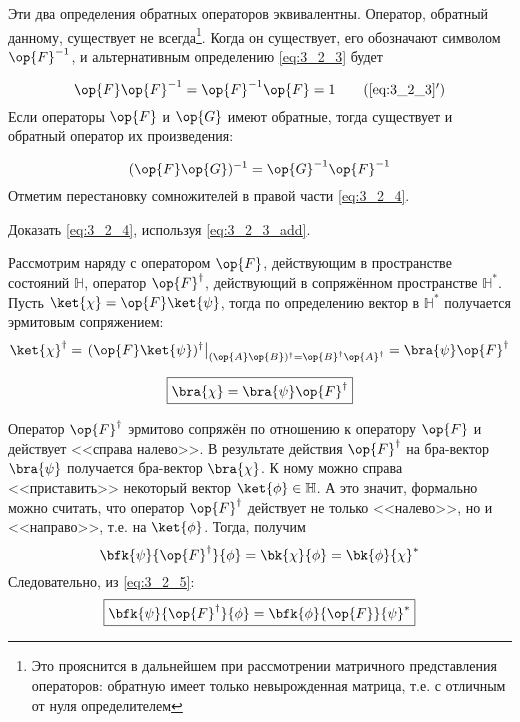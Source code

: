 \noindent
Эти два определения обратных операторов эквивалентны. Оператор, обратный данному, существует не всегда\footnote{Это прояснится в дальнейшем при рассмотрении матричного представления операторов: обратную имеет только невырожденная матрица, т.е. с отличным от нуля определителем}. Когда он существует, его обозначают символом $\op{F}^{-1}$, и альтернативным определению \eqref{eq:3_2_3} будет

\begin{equation}
\label{eq:3_2_3_add}
\op{F}\op{F}^{-1} = \op{F}^{-1}\op{F} = 1
\tag{\ref{eq:3_2_3}$'$}
\end{equation}%
%
Если операторы $\op{F}$ и $\op{G}$ имеют обратные, тогда существует и обратный оператор их произведения: 

\begin{equation}
\label{eq:3_2_4}
(\op{F}\op{G})^{-1} = \op{G}^{-1} \op{F}^{-1}
\end{equation}%
%
Отметим перестановку сомножителей в правой части \eqref{eq:3_2_4}.

\begin{excr}
Доказать \eqref{eq:3_2_4}, используя \eqref{eq:3_2_3_add}.
\end{excr}

Рассмотрим наряду с оператором  $\op{F}$, действующим в пространстве состояний $\mathbb{H}$, оператор $\op{F}^\dag$, действующий в сопряжённом пространстве $\mathbb{H}^*$. Пусть $\ket{\chi} = \op{F}\ket{\psi}$, тогда по определению вектор в $\mathbb{H}^*$ получается эрмитовым сопряжением:
$$
\ket{\chi}^\dag = \left. (\op{F}\ket{\psi})^\dag \right|_{(\op{A}\op{B})^\dag = \op{B}^\dag \op{A}^\dag} = \bra{\psi} \op{F}^\dag
$$

\begin{equation}
\label{eq:3_2_5}
\boxed{
	\bra{\chi} = \bra{\psi} \op{F}^\dag
}
\end{equation}

Оператор $\op{F}^\dag$ эрмитово сопряжён по отношению к оператору $\op{F}$ и действует <<справа налево>>. В результате действия $\op{F}^\dag$ на бра-вектор $\bra{\psi}$ получается бра-вектор $\bra{\chi}$. К ному можно справа <<приставить>> некоторый вектор $\ket{\phi} \in \mathbb{H}$. А это значит, формально можно считать, что оператор $\op{F}^\dag$ действует не только <<налево>>, но и <<направо>>, т.е. на $\ket{\phi}$. Тогда, получим%
%
$$
\bfk{\psi}{\op{F}^\dag}{\phi} = \bk{\chi}{\phi} = \bk{\phi}{\chi}^*
$$%
%
Следовательно, из \eqref{eq:3_2_5}:%
%
\begin{equation}
\label{eq:3_2_6}
\boxed{
  \bfk{\psi}{\op{F}^\dag}{\phi} = \bfk{\phi}{\op{F}}{\psi}^*
}
\end{equation}

